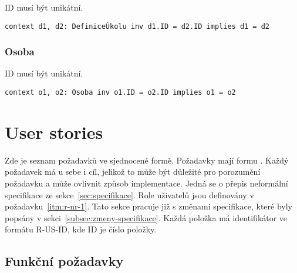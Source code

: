 ID musí být unikátní.

\begin{verbatim}
context d1, d2: DefiniceÚkolu inv d1.ID = d2.ID implies d1 = d2
\end{verbatim}

\subsubsection{Osoba}

ID musí být unikátní.

\begin{verbatim}
context o1, o2: Osoba inv o1.ID = o2.ID implies o1 = o2
\end{verbatim}


\section{User stories}\label{sec:user-stories}

Zde je seznam požadavků ve sjednocené formě.
Požadavky mají formu .
Každý požadavek má u sebe i cíl, jelikož to může být důležité pro porozumění požadavku a může ovlivnit způsob implementace.
Jedná se o přepis neformální specifikace ze sekce~\ref{sec:specifikace}.
Role uživatelů jsou definovány v požadavku~\ref{itm:r-nr-1}.
Tato sekce pracuje již s změnami specifikace, které byly popsány v sekci~\ref{subsec:zmeny-specifikace}.
Každá položka má identifikátor ve formátu R-US-ID, kde ID je číslo položky.

\subsection{Funkční požadavky}\label{subsec:user-stories-funkcni-pozadavky}

